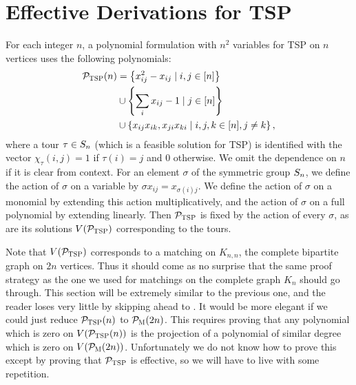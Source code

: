 \section{Effective Derivations for \textsc{TSP}}

For each integer $n$, a polynomial formulation with $n^2$ variables for \textsc{TSP} on $n$ vertices uses the following polynomials:
\begin{align}
\label{eq:tsp-formulation}\mathcal P_{\textsc{TSP}}(n) &= \left\{x_{ij}^2 - x_{ij} \mid i,j \in [n]\right\} \\ &\cup \left\{\sum_i x_{ij} - 1 \mid j \in [n]\right\} \nonumber \\ &\cup \left\{x_{ij}x_{ik}, x_{ji}x_{ki} \mid i,j,k \in [n], j \neq k\right\} \nonumber,
\end{align}
where a tour $\tau \in S_{n}$ (which is a feasible solution for \textsc{TSP}) is identified with the vector $\chi_\tau(i,j) = 1$ if $\tau(i) = j$ and $0$ otherwise. We omit the dependence on $n$ if it is clear from context. For an element $\sigma$ of the symmetric group $S_{n}$, we define the action of $\sigma$ on a variable by $\sigma x_{ij} = x_{\sigma(i)j}$.
We define the action of $\sigma$ on a monomial by extending this action multiplicatively, and the action of $\sigma$ on a full polynomial by extending linearly.
Then $\mathcal P_{\textsc{TSP}}$ is fixed by the action of every $\sigma$, as are its solutions $V(\mathcal P_{\textsc{TSP}})$ corresponding to the tours. 

Note that $V(\mathcal P_{\textsc{TSP}})$ corresponds to a matching on $K_{n,n}$, the complete bipartite graph on $2n$ vertices. Thus it should come as no surprise that the same proof strategy as the one we used for matchings on the complete graph $K_n$ should go through. This section will be extremely similar to the previous one, and the reader loses very little by skipping ahead to . It would be more elegant if we could just reduce $\mathcal P_{\textsc{TSP}}(n)$ to $\mathcal P_{\textsc{M}}(2n)$. This requires proving that any polynomial which is zero on $V(\mathcal P_{\textsc{TSP}}(n))$ is the projection of a polynomial of similar degree which is zero on $V(\mathcal P_{\textsc{M}}(2n))$. Unfortunately we do not know how to prove this except by proving that $\mathcal P_{\textsc{TSP}}$ is effective, so we will have to live with some repetition. 

